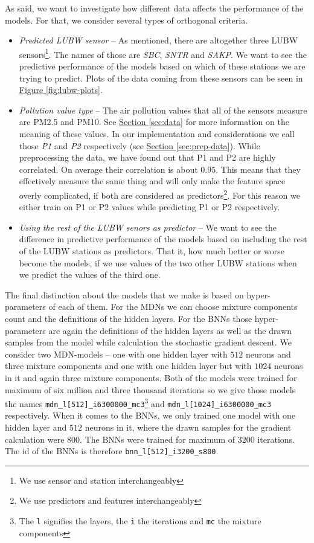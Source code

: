 \documentclass[12pt,a4paper,twoside]{scrartcl}
\numberwithin{equation}{section}
\newcommand{\reffig}[1]{\hyperref[#1]{Figure \ref*{#1}}}
\newcommand{\refsec}[1]{\hyperref[#1]{Section \ref*{#1}}}
\begin{document}
As said, we want to investigate how different data affects the performance of the models. For that, we consider several types of orthogonal criteria.
\begin{itemize}
\item \emph{Predicted LUBW sensor} -- As mentioned, there are altogether three LUBW sensors\footnote{We use sensor and station interchangeably}. The names of those are \emph{SBC}, \emph{SNTR} and \emph{SAKP}. We want to see the predictive performance of the models based on which of these stations we are trying to predict. Plots of the data coming from these sensors can be seen in \reffig{fig:lubw-plots}.
\item \emph{Pollution value type} -- The air pollution values that all of the sensors measure are PM2.5 and PM10. See \refsec{sec:data} for more information on the meaning of these values. In our implementation and considerations we call those \emph{P1} and \emph{P2} respectively (see \refsec{sec:prep-data}). While preprocessing the data, we have found out that P1 and P2 are highly correlated. On average their correlation is about \(0.95\). This means that they effectively measure the same thing and will only make the feature space overly complicated, if both are considered as predictors\footnote{We use predictors and features interchangeably}. For this reason we either train on P1 or P2 values while predicting P1 or P2 respectively.
\item \emph{Using the rest of the LUBW senors as predictor} -- We want to see the difference in predictive performance of the models based on including the rest of the LUBW stations as predictors. That it, how much better or worse become the models, if we use values of the two other LUBW stations when we predict the values of the third one.
\end{itemize}

The final distinction about the models that we make is based on hyper-parameters of each of them. For the MDNs we can choose mixture components count and the definitions of the hidden layers. For the BNNs those hyper-parameters are again the definitions of the hidden layers as well as the drawn samples from the model while calculation the stochastic gradient descent. We consider two MDN-models -- one with one hidden layer with \(512\) neurons and three mixture components and one with one hidden layer but with \(1024\) neurons in it and again three mixture components. Both of the models were trained for maximum of six million and three thousand iterations so we give those models the names \texttt{mdn\_l[512]\_i6300000\_mc3}\footnote{The \texttt{l} signifies the layers, the \texttt{i} the iterations and \texttt{mc} the mixture components} and \texttt{mdn\_l[1024]\_i6300000\_mc3} respectively. When it comes to the BNNs, we only trained one model with one hidden layer and \(512\) neurons in it, where the drawn samples for the gradient calculation were \(800\). The BNNs were trained for maximum of \(3200\) iterations. The id of the BNNs is therefore \texttt{bnn\_l[512]\_i3200\_s800}.
\end{document}
